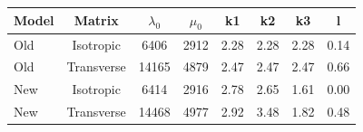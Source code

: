 \documentclass[a4paper,fleqn]{DC_ArtStyle}
\begin{document}
	\begin{table}
		\begin{tabular}{l|c|c|c|c|c|c|c}
			Model & Matrix & $\lambda_0$ & $\mu_0$ & k1 & k2 & k3 & l \\
			\hline
			Old & Isotropic & 6406 & 2912 & 2.28 & 2.28 & 2.28 & 0.14 \\
			Old & Transverse & 14165 & 4879 & 2.47 & 2.47 & 2.47 & 0.66 \\
			New & Isotropic & 6414 & 2916 & 2.78 & 2.65 & 1.61 & 0.00 \\
			New & Transverse & 14468 & 4977 & 2.92 & 3.48 & 1.82 & 0.48 \\
			\hline
		\end{tabular}
	\end{table}

	\clearpage
\end{document}
